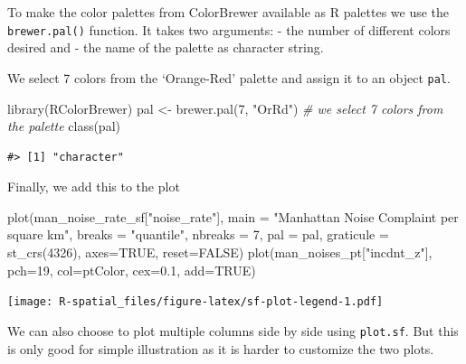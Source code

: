 \documentclass[
  11pt,
]{book}
\newenvironment{Shaded}{\begin{snugshade}}{\end{snugshade}}
\newcommand{\AttributeTok}[1]{\textcolor[rgb]{0.77,0.63,0.00}{#1}}
\newcommand{\CommentTok}[1]{\textcolor[rgb]{0.56,0.35,0.01}{\textit{#1}}}
\newcommand{\ConstantTok}[1]{\textcolor[rgb]{0.00,0.00,0.00}{#1}}
\newcommand{\DecValTok}[1]{\textcolor[rgb]{0.00,0.00,0.81}{#1}}
\newcommand{\FloatTok}[1]{\textcolor[rgb]{0.00,0.00,0.81}{#1}}
\newcommand{\FunctionTok}[1]{\textcolor[rgb]{0.00,0.00,0.00}{#1}}
\newcommand{\NormalTok}[1]{#1}
\newcommand{\OtherTok}[1]{\textcolor[rgb]{0.56,0.35,0.01}{#1}}
\newcommand{\StringTok}[1]{\textcolor[rgb]{0.31,0.60,0.02}{#1}}
\begin{document}
To make the color palettes from ColorBrewer available as R palettes we use the \texttt{brewer.pal()} function. It takes two arguments:
- the number of different colors desired and
- the name of the palette as character string.

We select 7 colors from the `Orange-Red' palette and assign it to an object \texttt{pal}.

\begin{Shaded}
\begin{Highlighting}[]
\FunctionTok{library}\NormalTok{(RColorBrewer)}
\NormalTok{pal }\OtherTok{\textless{}{-}} \FunctionTok{brewer.pal}\NormalTok{(}\DecValTok{7}\NormalTok{, }\StringTok{"OrRd"}\NormalTok{) }\CommentTok{\# we select 7 colors from the palette}
\FunctionTok{class}\NormalTok{(pal)}
\end{Highlighting}
\end{Shaded}

\begin{verbatim}
#> [1] "character"
\end{verbatim}

Finally, we add this to the plot

\begin{Shaded}
\begin{Highlighting}[]
\FunctionTok{plot}\NormalTok{(man\_noise\_rate\_sf[}\StringTok{"noise\_rate"}\NormalTok{], }
     \AttributeTok{main =} \StringTok{"Manhattan Noise Complaint per square km"}\NormalTok{, }
     \AttributeTok{breaks =} \StringTok{"quantile"}\NormalTok{, }\AttributeTok{nbreaks =} \DecValTok{7}\NormalTok{,}
     \AttributeTok{pal =}\NormalTok{ pal,}
     \AttributeTok{graticule =} \FunctionTok{st\_crs}\NormalTok{(}\DecValTok{4326}\NormalTok{),}
     \AttributeTok{axes=}\ConstantTok{TRUE}\NormalTok{,}
     \AttributeTok{reset=}\ConstantTok{FALSE}\NormalTok{)}
\FunctionTok{plot}\NormalTok{(man\_noises\_pt[}\StringTok{"incdnt\_z"}\NormalTok{], }\AttributeTok{pch=}\DecValTok{19}\NormalTok{, }\AttributeTok{col=}\NormalTok{ptColor, }\AttributeTok{cex=}\FloatTok{0.1}\NormalTok{, }\AttributeTok{add=}\ConstantTok{TRUE}\NormalTok{)}
\end{Highlighting}
\end{Shaded}

\texttt{[image: R-spatial\_files/figure-latex/sf-plot-legend-1.pdf]}

We can also choose to plot multiple columns side by side using \texttt{plot.sf}. But this is only good for simple illustration as it is harder to customize the two plots.
\end{document}
